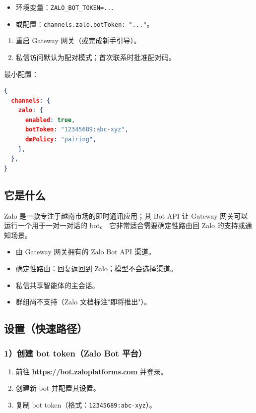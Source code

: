 \begin{itemize}
  \item 环境变量：\texttt{ZALO\_BOT\_TOKEN=...}
  \item 或配置：\texttt{channels.zalo.botToken: "..."}。
\end{itemize}

\begin{enumerate}
  \item 重启 Gateway 网关（或完成新手引导）。
  \item 私信访问默认为配对模式；首次联系时批准配对码。
\end{enumerate}


最小配置：

\begin{lstlisting}[language=json]
{
  channels: {
    zalo: {
      enabled: true,
      botToken: "12345689:abc-xyz",
      dmPolicy: "pairing",
    },
  },
}
\end{lstlisting}


\subsection{它是什么}


Zalo 是一款专注于越南市场的即时通讯应用；其 Bot API 让 Gateway 网关可以运行一个用于一对一对话的 bot。
它非常适合需要确定性路由回 Zalo 的支持或通知场景。

\begin{itemize}
  \item 由 Gateway 网关拥有的 Zalo Bot API 渠道。
  \item 确定性路由：回复返回到 Zalo；模型不会选择渠道。
  \item 私信共享智能体的主会话。
  \item 群组尚不支持（Zalo 文档标注"即将推出"）。
\end{itemize}


\subsection{设置（快速路径）}


\subsubsection{1）创建 bot token（Zalo Bot 平台）}


\begin{enumerate}
  \item 前往 \textbf{https://bot.zaloplatforms.com} 并登录。
  \item 创建新 bot 并配置其设置。
  \item 复制 bot token（格式：\texttt{12345689:abc-xyz}）。
\end{enumerate}


